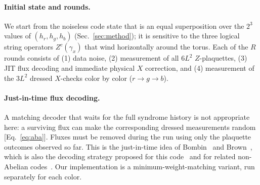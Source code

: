 \documentclass[a4paper]{article}
\newcommand{\rd}{r}
\newcommand{\gr}{g}
\newcommand{\bl}{b}
\begin{document}
\paragraph{Initial state and rounds.}
We start from the noiseless code state that is an equal superposition over the $2^3$ values of $(h_\rd,h_\gr,h_\bl)$ (Sec.~\ref{sec:method}); it is sensitive to the three logical string operators $Z^c(\gamma_x)$ that wind horizontally around the torus. Each of the $R$ rounds consists of (1) data noise, (2) measurement of all $6L^2$ $Z$-plaquettes, (3) JIT flux decoding and immediate physical $X$ correction, and (4) measurement of the $3L^2$ dressed $X$-checks color by color ($\rd\to\gr\to\bl$).

\paragraph{Just-in-time flux decoding.}
A matching decoder that waits for the full syndrome history is not appropriate here: a surviving flux can make the corresponding dressed measurements random [Eq.~\eqref{eq:aba}]. Fluxes must be removed during the run using only the plaquette outcomes observed so far. This is the just-in-time idea of Bombin~\cite{bombin2018jit} and Brown~\cite{brown2020jit}, which is also the decoding strategy proposed for this code~\cite{kobayashi2025clifford} and for related non-Abelian codes~\cite{davydova2025knots,magdalena2026}. Our implementation is a minimum-weight-matching variant, run separately for each color.
\end{document}
